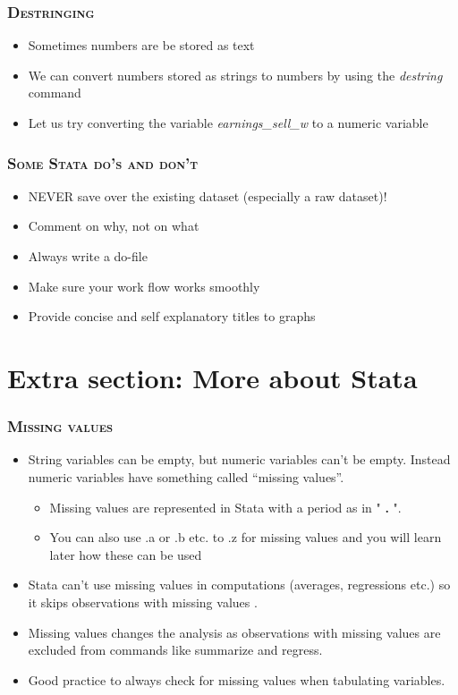 \documentclass[10pt]{beamer}
\begin{document}
	\begin{frame}
		\frametitle{\textsc{Destringing}}

		\begin{itemize}
			\item Sometimes numbers are be stored as text
			\item We can convert numbers stored as strings to numbers by using the \textit{destring} command
			\item Let us try converting the variable \textit{earnings\_sell\_w} to a numeric variable
		\end{itemize}
\begin{stlog}\end{stlog}
	\end{frame}
		\begin{frame}
	\frametitle{\textsc{Some Stata do's and don't}}
	\begin{itemize}
		  \item NEVER save over the existing dataset (especially a raw dataset)!
		  \item Comment on why, not on what
		
		\item Always write a do-file
		  \item Make sure your work flow works smoothly
		  \item Provide concise and self explanatory titles to graphs
	  \end{itemize}
	 \end{frame}	
	 
	 
	 
	\section{Extra section: More about Stata}
	


	\begin{frame}
	\frametitle{\textsc{Missing values}}
		\begin{itemize}
			\item String variables can be empty, but numeric variables can't be empty. 
				  Instead numeric variables have something called “missing values”.
				\begin{itemize}
					\item Missing values are represented in Stata with a period as in " \textbf{.} ". 
					\item You can also use .a or .b etc. to .z for missing values 
						  and you will learn later how these can be used
				\end{itemize}
			\item Stata can't use missing values in computations (averages, regressions etc.) 
				  so it skips observations with missing values . 
			\item Missing values changes the analysis as observations with 
				  missing values are excluded from commands like summarize and regress.
			\item Good practice to always check for missing values when tabulating variables.			
		\end{itemize}
	\end{frame}
	
\end{document}
